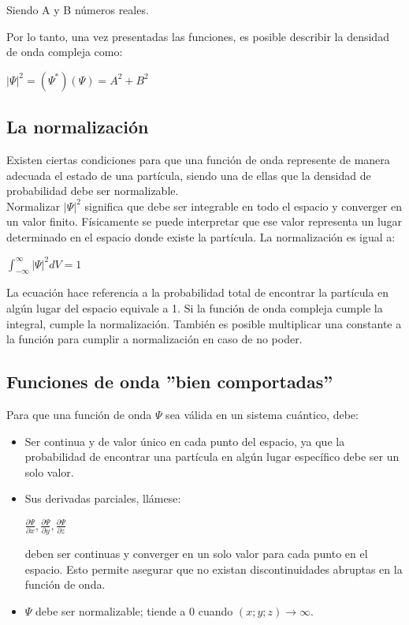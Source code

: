 \documentclass[a4paper]{article}
\begin{document}
        Siendo A y B números reales.

        \indent Por lo tanto, una vez presentadas las funciones, es posible describir la densidad de onda compleja como:

        \begin{center}
            $|\Psi|^2 = (\Psi^*) (\Psi) = A^2 + B^2$
        \end{center}

    \subsection{La normalización}
        \indent Existen ciertas condiciones para que una función de onda represente de manera adecuada el estado de una partícula, siendo una de ellas que la densidad de probabilidad debe ser normalizable. \\
        \indent Normalizar $|\Psi|^2$ significa que debe ser integrable en todo el espacio y converger en un valor finito. Físicamente se puede interpretar que ese valor representa un lugar determinado en el espacio donde existe la partícula. La normalización es igual a:

        \begin{center}
            $\int_{- \infty}^{\infty} |\Psi|^2 dV = 1$ 
        \end{center}

        La ecuación hace referencia a la probabilidad total de encontrar la partícula en algún lugar del espacio equivale a 1. Si la función de onda compleja cumple la integral, cumple la normalización. También es posible multiplicar una constante a la función para cumplir a normalización en caso de no poder.

    \subsection{Funciones de onda ''bien comportadas''}
        \indent Para que una función de onda $\Psi$ sea válida en un sistema cuántico, debe:

        \begin{itemize} 
            \item Ser continua y de valor único en cada punto del espacio, ya que la probabilidad de encontrar una partícula en algún lugar específico debe ser un solo valor.
            \saltoPag
            \item Sus derivadas parciales, llámese:
                \begin{center}
                    $\frac {\partial \Psi}{\partial x}, \frac{\partial \Psi}{\partial y}, \frac{\partial \Psi}{\partial z}$
                \end{center}
            deben ser continuas y converger en un solo valor para cada punto en el espacio. Esto permite asegurar que no existan discontinuidades abruptas en la función de onda.
        \item $\Psi$ debe ser normalizable; tiende a 0 cuando $(x;y;z) \rightarrow \infty$.
        \end{itemize}
\end{document}
